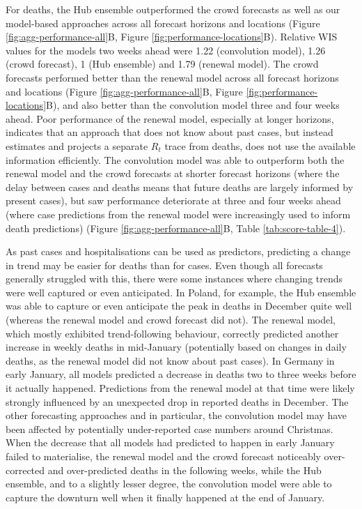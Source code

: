 \documentclass[10pt,letterpaper]{article} %
\begin{document}
For deaths, the Hub ensemble outperformed the crowd forecasts as well as
our model-based approaches across all forecast horizons and locations
(Figure \ref{fig:agg-performance-all}B, Figure
\ref{fig:performance-locations}B). Relative WIS values for the models
two weeks ahead were 1.22 (convolution model), 1.26 (crowd forecast), 1
(Hub ensemble) and 1.79 (renewal model). The crowd forecasts performed
better than the renewal model across all forecast horizons and locations
(Figure \ref{fig:agg-performance-all}B, Figure
\ref{fig:performance-locations}B), and also better than the convolution
model three and four weeks ahead. Poor performance of the renewal model,
especially at longer horizons, indicates that an approach that does not
know about past cases, but instead estimates and projects a separate
\(R_t\) trace from deaths, does not use the available information
efficiently. The convolution model was able to outperform both the
renewal model and the crowd forecasts at shorter forecast horizons
(where the delay between cases and deaths means that future deaths are
largely informed by present cases), but saw performance deteriorate at
three and four weeks ahead (where case predictions from the renewal
model were increasingly used to inform death predictions) (Figure
\ref{fig:agg-performance-all}B, Table \ref{tab:score-table-4}).

As past cases and hospitalisations can be used as predictors, predicting
a change in trend may be easier for deaths than for cases. Even though
all forecasts generally struggled with this, there were some instances
where changing trends were well captured or even anticipated. In Poland,
for example, the Hub ensemble was able to capture or even anticipate the
peak in deaths in December quite well (whereas the renewal model and
crowd forecast did not). The renewal model, which mostly exhibited
trend-following behaviour, correctly predicted another increase in
weekly deaths in mid-January (potentially based on changes in daily
deaths, as the renewal model did not know about past cases). In Germany
in early January, all models predicted a decrease in deaths two to three
weeks before it actually happened. Predictions from the renewal model at
that time were likely strongly influenced by an unexpected drop in
reported deaths in December. The other forecasting approaches and in
particular, the convolution model may have been affected by potentially
under-reported case numbers around Christmas. When the decrease that all
models had predicted to happen in early January failed to materialise,
the renewal model and the crowd forecast noticeably over-corrected and
over-predicted deaths in the following weeks, while the Hub ensemble,
and to a slightly lesser degree, the convolution model were able to
capture the downturn well when it finally happened at the end of
January.
\end{document}
